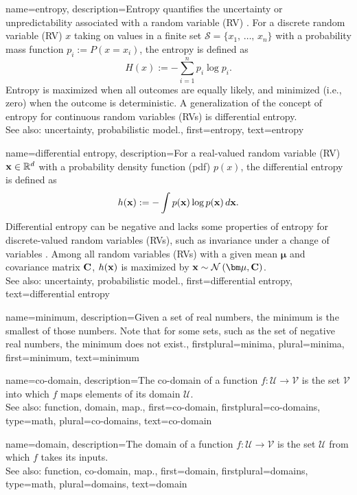 {
{name={entropy},
	description={Entropy quantifies the uncertainty or unpredictability associated with a random variable (RV) \cite{coverthomas}. 
		For a discrete random variable (RV) $x$ taking on values in a finite set $\mathcal{S} = \{x_1, \,\ldots, \,x_n\}$ with 
		a probability mass function $p_i := P\left(x = x_i\right)$, the entropy is defined as
		\[
		H(x) := -\sum_{i=1}^n p_i \log p_i.
		\]
		Entropy is maximized when all outcomes are equally likely, and minimized (i.e., zero) 
		when the outcome is deterministic. A generalization of the concept of entropy for continuous 
		random variables (RVs) is differential entropy. 
		\\
		See also: uncertainty, probabilistic model.},
	first={entropy},
	text={entropy}
}

{name={differential entropy},
	description={For a real-valued random variable (RV) ${\bf x} \in \mathbb{R}^{d}$ 
		with a probability density function (pdf) $p(x)$, the differential entropy is defined as \cite{coverthomas}
		\[
		h({\bf x}) := - \int p({\bf x}) \log p({\bf x}) \, d{\bf x}.
		\]
		Differential entropy can be negative and lacks some properties of entropy for 
		discrete-valued random variables (RVs), such as invariance under a change of variables \cite{coverthomas}. 
		Among all random variables (RVs) with a given mean ${\bm \mu}$ and covariance matrix ${\bf C}$, 
		$h({\bf x})$ is maximized by ${\bf x} \sim \mathcal{N}\left({\bm \mu},{\bf C}\right)$. 
		\\
		See also: uncertainty, probabilistic model.},
	first={differential entropy},
	text={differential entropy}
}

{name={minimum},
	description={Given a set of real numbers, the minimum is the smallest of those numbers.
		Note that for some sets, such as the set of negative real numbers, the minimum does not exist.},
	firstplural={minima}, 
 	plural={minima},
	first={minimum},
	text={minimum}
}


{name={co-domain}, 
	description={The co-domain of a function 
	$f: \mathcal{U} \rightarrow \mathcal{V}$ is the set $\mathcal{V}$ 
		into which $f$ maps elements of its domain $\mathcal{U}$.  
		\\
		See also: function, domain, map.},
	first={co-domain},
	firstplural={co-domains}, 
	type=math, 
	plural={co-domains},
	text={co-domain}
}

{name={domain}, 
	description={The domain of a function 
	$f: \mathcal{U} \rightarrow \mathcal{V}$ is the set $\mathcal{U}$ 
		from which $f$ takes its inputs.  
		\\
		See also: function, co-domain, map.},
	first={domain},
	firstplural={domains}, 
	type=math, 
	plural={domains},
	text={domain}
}	
	

}
